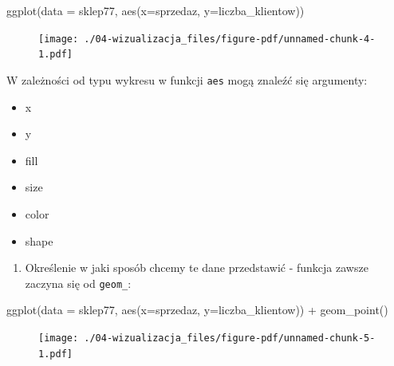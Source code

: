 \documentclass[
  letterpaper,
  DIV=11,
  numbers=noendperiod]{scrreprt}
\newenvironment{Shaded}{\begin{snugshade}}{\end{snugshade}}
\newcommand{\AttributeTok}[1]{\textcolor[rgb]{0.40,0.45,0.13}{#1}}
\newcommand{\FunctionTok}[1]{\textcolor[rgb]{0.28,0.35,0.67}{#1}}
\newcommand{\NormalTok}[1]{\textcolor[rgb]{0.00,0.23,0.31}{#1}}
\newcommand{\SpecialCharTok}[1]{\textcolor[rgb]{0.37,0.37,0.37}{#1}}
\providecommand{\tightlist}{%
  \setlength{\itemsep}{0pt}\setlength{\parskip}{0pt}}\usepackage{longtable,booktabs,array}
\begin{document}
\begin{Shaded}
\begin{Highlighting}[]
\FunctionTok{ggplot}\NormalTok{(}\AttributeTok{data =}\NormalTok{ sklep77, }\FunctionTok{aes}\NormalTok{(}\AttributeTok{x=}\NormalTok{sprzedaz, }\AttributeTok{y=}\NormalTok{liczba\_klientow))}
\end{Highlighting}
\end{Shaded}

\begin{figure}[H]

{\centering \texttt{[image: ./04-wizualizacja\_files/figure-pdf/unnamed-chunk-4-1.pdf]}

}

\end{figure}

W zależności od typu wykresu w funkcji \texttt{aes} mogą znaleźć się
argumenty:

\begin{itemize}
\tightlist
\item
  x
\item
  y
\item
  fill
\item
  size
\item
  color
\item
  shape
\end{itemize}

\begin{enumerate}
\def\labelenumi{\arabic{enumi}.}
\setcounter{enumi}{1}
\tightlist
\item
  Określenie w jaki sposób chcemy te dane przedstawić - funkcja zawsze
  zaczyna się od \texttt{geom\_}:
\end{enumerate}

\begin{Shaded}
\begin{Highlighting}[]
\FunctionTok{ggplot}\NormalTok{(}\AttributeTok{data =}\NormalTok{ sklep77, }\FunctionTok{aes}\NormalTok{(}\AttributeTok{x=}\NormalTok{sprzedaz, }\AttributeTok{y=}\NormalTok{liczba\_klientow)) }\SpecialCharTok{+}
  \FunctionTok{geom\_point}\NormalTok{()}
\end{Highlighting}
\end{Shaded}

\begin{figure}[H]

{\centering \texttt{[image: ./04-wizualizacja\_files/figure-pdf/unnamed-chunk-5-1.pdf]}

}

\end{figure}
\end{document}
